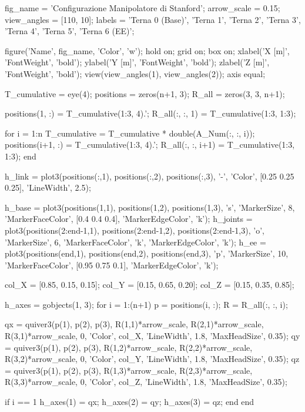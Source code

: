 \documentclass[11pt, a4paper]{article}
\begin{document}
\newpage
\begin{matlabcode}
fig_name    = 'Configurazione Manipolatore di Stanford';
arrow_scale = 0.15;
view_angles = [110, 10];
labels      = {'Terna 0 (Base)', 'Terna 1', 'Terna 2', 'Terna 3', 'Terna 4', 'Terna 5', 'Terna 6 (EE)'};

figure('Name', fig_name, 'Color', 'w');
hold on;
grid on;
box on;
xlabel('X [m]', 'FontWeight', 'bold');
ylabel('Y [m]', 'FontWeight', 'bold');
zlabel('Z [m]', 'FontWeight', 'bold');
view(view_angles(1), view_angles(2));
axis equal;

T_cumulative = eye(4);
positions = zeros(n+1, 3);
R_all     = zeros(3, 3, n+1);

positions(1, :) = T_cumulative(1:3, 4).';
R_all(:, :, 1)  = T_cumulative(1:3, 1:3);

for i = 1:n
    T_cumulative = T_cumulative * double(A_Num(:, :, i));
    positions(i+1, :) = T_cumulative(1:3, 4).';
    R_all(:, :, i+1)  = T_cumulative(1:3, 1:3);
end

h_link = plot3(positions(:,1), positions(:,2), positions(:,3), '-', 'Color', [0.25 0.25 0.25],
    'LineWidth', 2.5);

h_base = plot3(positions(1,1), positions(1,2), positions(1,3), 's',
    'MarkerSize', 8, 'MarkerFaceColor', [0.4 0.4 0.4], 'MarkerEdgeColor', 'k');
h_joints = plot3(positions(2:end-1,1), positions(2:end-1,2), positions(2:end-1,3), 'o',
    'MarkerSize', 6, 'MarkerFaceColor', 'k', 'MarkerEdgeColor', 'k');
h_ee = plot3(positions(end,1), positions(end,2), positions(end,3), 'p',
    'MarkerSize', 10, 'MarkerFaceColor', [0.95 0.75 0.1], 'MarkerEdgeColor', 'k');

col_X = [0.85, 0.15, 0.15];
col_Y = [0.15, 0.65, 0.20];
col_Z = [0.15, 0.35, 0.85];

h_axes = gobjects(1, 3);
for i = 1:(n+1)
    p = positions(i, :);
    R = R_all(:, :, i);

    qx = quiver3(p(1), p(2), p(3), R(1,1)*arrow_scale, R(2,1)*arrow_scale, R(3,1)*arrow_scale, 0,
        'Color', col_X, 'LineWidth', 1.8, 'MaxHeadSize', 0.35);
    qy = quiver3(p(1), p(2), p(3), R(1,2)*arrow_scale, R(2,2)*arrow_scale, R(3,2)*arrow_scale, 0,
        'Color', col_Y, 'LineWidth', 1.8, 'MaxHeadSize', 0.35);
    qz = quiver3(p(1), p(2), p(3), R(1,3)*arrow_scale, R(2,3)*arrow_scale, R(3,3)*arrow_scale, 0,
        'Color', col_Z, 'LineWidth', 1.8, 'MaxHeadSize', 0.35);

    if i == 1
        h_axes(1) = qx;
        h_axes(2) = qy;
        h_axes(3) = qz;
    end
end
\end{matlabcode}
\end{document}
